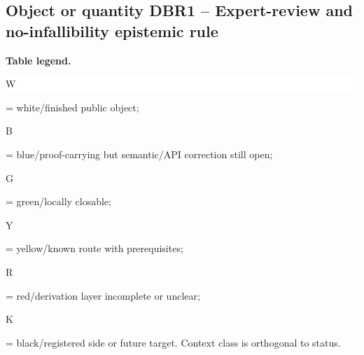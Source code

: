 \subsection*{Object or quantity DBR1 -- Expert-review and no-infallibility epistemic rule}
\hypertarget{objproof:DBR1}{}
\par\smallskip\noindent\begin{minipage}{0.99\linewidth}\footnotesize\raggedright\textbf{Table legend.} \colorbox{white}{\strut W} = white/finished public object; \colorbox{cyan!20}{\strut B} = blue/proof-carrying but semantic/API correction still open; \colorbox{green!18}{\strut G} = green/locally closable; \colorbox{yellow!25}{\strut Y} = yellow/known route with prerequisites; \colorbox{red!20}{\strut R} = red/derivation layer incomplete or unclear; \colorbox{black!18}{\strut K} = black/registered side or future target. Context class is orthogonal to status.\end{minipage}\par\vspace{0.25em}
